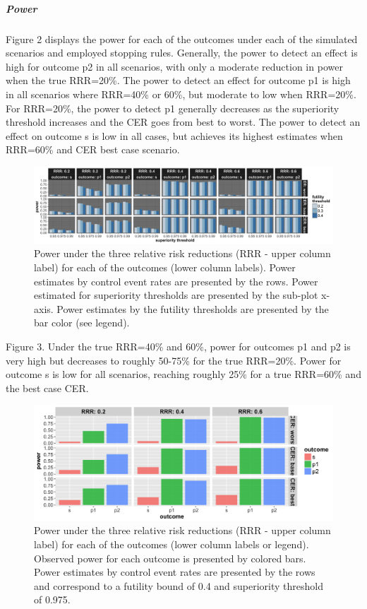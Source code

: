 \documentclass[]{article}
\let\oldsubparagraph\subparagraph
\renewcommand{\subparagraph}[1]{\oldsubparagraph{#1}\mbox{}}
\begin{document}
\hypertarget{power}{%
\subparagraph{Power}\label{power}}

Figure 2 displays the power for each of the outcomes under each of the
simulated scenarios and employed stopping rules. Generally, the power to
detect an effect is high for outcome p2 in all scenarios, with only a
moderate reduction in power when the true RRR=20\%. The power to detect
an effect for outcome p1 is high in all scenarios where RRR=40\% or
60\%, but moderate to low when RRR=20\%. For RRR=20\%, the power to
detect p1 generally decreases as the superiority threshold increases and
the CER goes from best to worst. The power to detect an effect on
outcome s is low in all cases, but achieves its highest estimates when
RRR=60\% and CER best case scenario.

\begin{figure}
  \caption{Power under the three relative risk reductions (RRR - upper column label) for each of the outcomes (lower
  column labels). Power estimates by control event rates are presented by the rows. Power estimated for superiority
  thresholds are presented by the sub-plot x-axis. Power estimates by the futility thresholds are presented by the bar
  color (see legend).}
  \includegraphics{../plots/stop_p1_new/power_all_sim_05_stopp1_new.png}
\end{figure}

Figure 3. Under the true RRR=40\% and 60\%, power for outcomes p1 and p2
is very high but decreases to roughly 50-75\% for the true RRR=20\%.
Power for outcome s is low for all scenarios, reaching roughly 25\% for
a true RRR=60\% and the best case CER.

\begin{figure}
  \caption{Power under the three relative risk reductions (RRR - upper column label) for each of the outcomes (lower
  column labels or legend). Observed power for each outcome is presented by colored bars. Power estimates by control
  event rates are presented by the rows and correspond to a futility bound of 0.4 and superiority threshold of 0.975.}
  \includegraphics{../plots/stop_p1_new/power_sim_05_stopp1_new.png}
\end{figure}
\end{document}
